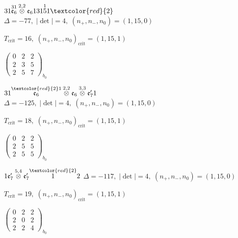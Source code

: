 \documentclass[10pt]{article}
\begin{document}
\smallskip

$31\overset{31}{\mathfrak{e}_6}\overset{2,2}{\otimes}\mathfrak{e}_6131\overset{1}{5}1\textcolor{red}{2}$ \quad $\Delta=-77,\; |\det|=4,\; (n_+,n_-,n_0)=(1,15,0)$

\hspace{1em}$T_{\text{crit}}=16,\; (n_+,n_-,n_0)_{\text{crit}}=(1,15,1)$

\hspace{2em}$\left(\begin{smallmatrix}0 & 2 & 2 \\ 2 & 3 & 5 \\ 2 & 5 & 7\end{smallmatrix}\right)_{\!b_0}$

\smallskip

$31\overset{\textcolor{red}{2}1}{\mathfrak{e}_6}\overset{2,2}{\otimes}\mathfrak{e}_6\overset{3,3}{\otimes}\mathfrak{e}_7'1$ \quad $\Delta=-125,\; |\det|=4,\; (n_+,n_-,n_0)=(1,15,0)$

\hspace{1em}$T_{\text{crit}}=18,\; (n_+,n_-,n_0)_{\text{crit}}=(1,15,1)$

\hspace{2em}$\left(\begin{smallmatrix}0 & 2 & 2 \\ 2 & 5 & 5 \\ 2 & 5 & 5\end{smallmatrix}\right)_{\!b_0}$

\smallskip

$1\mathfrak{e}_7'\overset{5,4}{\otimes}\mathfrak{e}_7'\overset{\textcolor{red}{2}}{1}2$ \quad $\Delta=-117,\; |\det|=4,\; (n_+,n_-,n_0)=(1,15,0)$

\hspace{1em}$T_{\text{crit}}=19,\; (n_+,n_-,n_0)_{\text{crit}}=(1,15,1)$

\hspace{2em}$\left(\begin{smallmatrix}0 & 2 & 2 \\ 2 & 0 & 2 \\ 2 & 2 & 4\end{smallmatrix}\right)_{\!b_0}$
\end{document}
